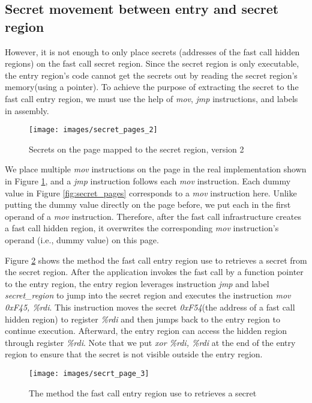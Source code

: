  \subsection{Secret movement between entry and secret region}
 However, it is not enough to only place secrets
 (addresses of the fast call hidden regions) on the fast call secret region. 
 Since the secret region is only executable, the entry region's code cannot 
 get the secrets out by reading the secret region's memory(using a pointer).
To achieve the purpose of extracting the secret to the fast call entry region, 
  we must use the help of \emph{mov}, \emph{jmp} instructions, and labels in assembly.

 \begin{figure}[tbp]
   \centering
   \texttt{[image: images/secret\_pages\_2]}
   \caption[Short description]{Secrets on the page mapped to the secret region, version 2}
    \label{fig:secret_pages_2}
 \end{figure}
  
 We place multiple \emph{mov} instructions on the page in the real implementation shown in Figure \ref{fig:secret_pages_2},
 and a \emph{jmp} instruction follows each \emph{mov} instruction. Each dummy value in 
 Figure \ref{fig:secret_pages} corresponds to a \emph{mov} instruction here. Unlike putting the 
 dummy value directly on the page before, we put each in the first operand of
  a \emph{mov} instruction. Therefore, after the fast call infrastructure creates a fast 
  call hidden region, it overwrites the corresponding \emph{mov} instruction's 
  operand (i.e., dummy value) on this page.  


  Figure \ref{fig:secrt_page_3}  shows the method the fast call entry region use to retrieves a 
  secret from the secret region. After the application invokes the 
  fast call by a function pointer to the entry region, the entry region 
  leverages instruction \emph{jmp} and label \emph{secret\_region} to jump into the 
  secret region and executes the instruction \emph{mov 0xF45, \%rdi}. This 
  instruction moves the secret \emph{0xF54}(the address of a fast call hidden region) 
  to register \emph{\%rdi} and then jumps back to the entry region to continue execution. 
  Afterward, the entry region can access the hidden region through register \emph{\%rdi}.
  Note that we put  \emph{xor \%rdi, \%rdi} at the end of the entry region to ensure that the secret is not visible outside the entry region. 

  \begin{figure}[H]
    \centering
    \texttt{[image: images/secrt\_page\_3]}
    \caption[Short description]{The method the fast call entry region use to retrieves a 
    secret}
     \label{fig:secrt_page_3}
  \end{figure}

